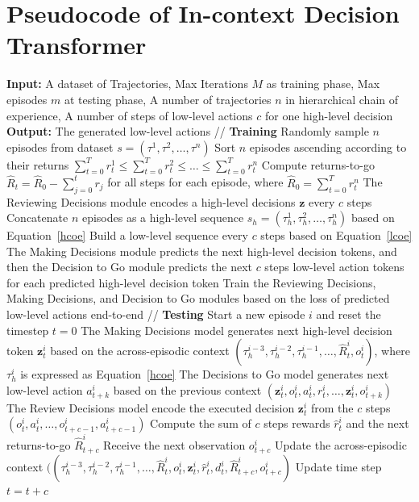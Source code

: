 \documentclass{article}
\theoremstyle{plain}
\theoremstyle{definition}
\theoremstyle{remark}
\begin{document}
\section{Pseudocode of In-context Decision Transformer}
\label{appendix A}
\begin{algorithm}[h!]
\caption{In-context Decision Transformer.}
\label{IDT algorithm}
\begin{algorithmic}[1]
\STATE \textbf{Input:} A dataset of Trajectories, Max Iterations $M$ as training phase, Max episodes $m$ at testing phase, A number of trajectories $n$ in hierarchical chain of experience, A number of steps of low-level actions $c$ for one high-level decision
\STATE \textbf{Output:} The generated low-level actions
\STATE // \textbf{Training}
    \STATE Randomly sample $n$ episodes from dataset $s=(\tau^{1},\tau^{2},\dots,\tau^{n})$
    \STATE Sort $n$ episodes ascending according to their returns $\sum_{t=0}^T{r_t^1}\leq\sum_{t=0}^T{r_t^2}\leq\dots\leq\sum_{t=0}^T{r_t^n}$
    \STATE Compute returns-to-go $\hat{R}_t=\hat{R}_0-\sum_{j=0}^tr_j$ for all steps for each episode, where $\hat{R}_0=\sum_{t=0}^T{r_t^n}$
    \STATE The Reviewing Decisions module encodes a high-level decisions $\textbf{z}$ every $c$ steps
    \STATE Concatenate $n$ episodes as a high-level sequence $s_h=(\tau_h^{1},\tau_h^{2},\dots,\tau_h^{n})$ based on Equation~\eqref{hcoe}
    \STATE Build a low-level sequence every $c$ steps based on Equation~\eqref{lcoe}
    \STATE The Making Decisions module predicts the next high-level decision tokens, and then the Decision to Go module predicts the next $c$ steps low-level action tokens for each predicted high-level decision token
    \STATE Train the Reviewing Decisions, Making Decisions, and Decision to Go modules based on the loss of predicted low-level actions end-to-end
\ENDFOR
\STATE // \textbf{Testing}
    \STATE Start a new episode $i$ and reset the timestep $t=0$
        \STATE The Making Decisions model generates next high-level decision token $\textbf{z}_t^i$ based on the across-episodic context $(\tau_h^{i-3},\tau_h^{i-2},\tau_h^{i-1},\dots,\hat{R}_t^i,o_t^i)$, where $\tau_h^{i}$ is expressed as Equation~\eqref{hcoe}
            \STATE The Decisions to Go model generates next low-level action $a_{t+k}^i$ based on the previous context $(\textbf{z}_t^i,o_t^i,a_t^i,r_t^i,\dots,\textbf{z}_{t}^i,o_{t+k}^i)$
        \ENDFOR
        \STATE The Review Decisions model encode the executed decision $\textbf{z}_t^i$ from the $c$ steps $(o_t^i,a_t^i,\dots,o_{t+c-1}^i,a_{t+c-1}^i)$
        \STATE Compute the sum of $c$ steps rewards $\hat{r}_t^i$ and the next returns-to-go $\hat{R}_{t+c}^i$
        \STATE Receive the next observation $o_{t+c}^i$
        \STATE Update the across-episodic context $((\tau_h^{i-3},\tau_h^{i-2},\tau_h^{i-1},\dots,\hat{R}_t^i,o_t^i,\textbf{z}_t^i,\hat{r}_t^i,d_t^i,\hat{R}_{t+c}^i,o_{t+c}^i)$
        \STATE Update time step $t = t+c$
    \ENDWHILE
\ENDFOR
\end{algorithmic}
\end{algorithm}
\end{document}
